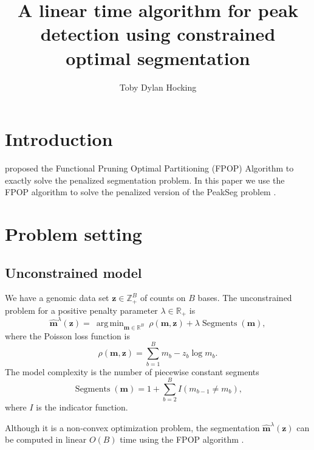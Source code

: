 \documentclass{article}
\DeclareMathOperator*{\argmin}{arg\,min}
\DeclareMathOperator*{\Segments}{Segments}
\newcommand{\ZZ}{\mathbb Z}
\newcommand{\RR}{\mathbb R}
\begin{document}
\title{A linear time algorithm for peak detection using constrained
  optimal segmentation}

\author{Toby Dylan Hocking}

\maketitle

\section{Introduction}

\citet{FPOP} proposed the Functional Pruning Optimal Partitioning
(FPOP) Algorithm to exactly solve the penalized segmentation
problem. In this paper we use the FPOP algorithm to solve the
penalized version of the PeakSeg problem \citep{PeakSeg}.

\section{Problem setting}

\subsection{Unconstrained model}

We have a genomic data set $\mathbf{z}\in\ZZ_+^B$ of counts on $B$
bases. The unconstrained problem for a positive penalty parameter
$\lambda\in\RR_+$ is
\begin{equation}
  \label{unconstrained}
  \mathbf{\hat m}^\lambda(\mathbf z)  =\ 
  \argmin_{\mathbf m\in\RR^{B}}\ 
  \rho
  (\mathbf m, \mathbf z) 
  +\lambda\Segments(\mathbf m),
\end{equation}
where the Poisson loss function is
\begin{equation}\label{eq:rho}
  \rho(\mathbf m, \mathbf z)= \sum_{b=1}^B m_b - z_b \log m_b.
\end{equation} 
The model complexity is the number of piecewise constant segments
\begin{equation}
  \Segments(\mathbf m)=1+\sum_{b=2}^B I(m_{b-1} \neq m_b),
\end{equation}
where $I$ is the indicator function.

Although it is a non-convex optimization problem, the segmentation
$\mathbf{\hat m}^\lambda(\mathbf z)$ can be computed in linear $O(B)$
time using the FPOP algorithm \citep{FPOP}.
\end{document}

